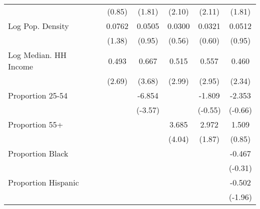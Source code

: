 {\begin{tabular}{l*{6}{c}}
                    &                     &      (0.85)         &      (1.81)         &      (2.10)         &      (2.11)         &      (1.81)         \\
\addlinespace
Log Pop. Density    &                     &      0.0762         &      0.0505         &      0.0300         &      0.0321         &      0.0512         \\
                    &                     &      (1.38)         &      (0.95)         &      (0.56)         &      (0.60)         &      (0.95)         \\
\addlinespace
Log Median. HH Income&                     &       0.493\sym{**} &       0.667\sym{***}&       0.515\sym{**} &       0.557\sym{**} &       0.460\sym{*}  \\
                    &                     &      (2.69)         &      (3.68)         &      (2.99)         &      (2.95)         &      (2.34)         \\
\addlinespace
Proportion 25-54    &                     &                     &      -6.854\sym{***}&                     &      -1.809         &      -2.353         \\
                    &                     &                     &     (-3.57)         &                     &     (-0.55)         &     (-0.66)         \\
\addlinespace
Proportion 55+      &                     &                     &                     &       3.685\sym{***}&       2.972         &       1.509         \\
                    &                     &                     &                     &      (4.04)         &      (1.87)         &      (0.85)         \\
\addlinespace
Proportion Black    &                     &                     &                     &                     &                     &      -0.467         \\
                    &                     &                     &                     &                     &                     &     (-0.31)         \\
\addlinespace
Proportion Hispanic &                     &                     &                     &                     &                     &      -0.502         \\
                    &                     &                     &                     &                     &                     &     (-1.96)         \\

\end{tabular}}
